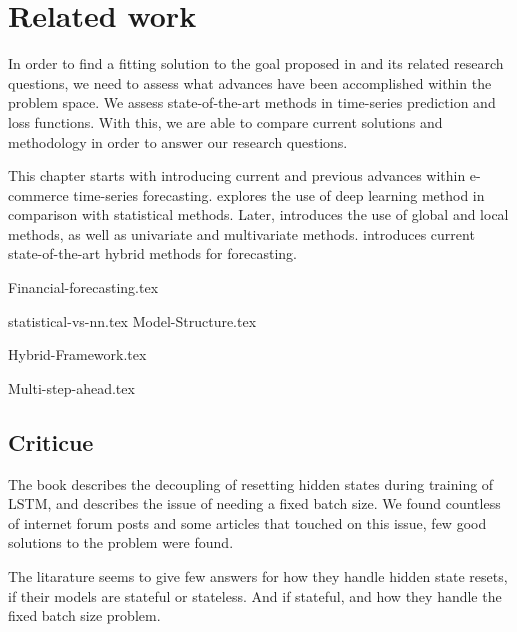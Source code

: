 \chapter{Related work}
\label{section:RelatedWork}

In order to find a fitting solution to the goal proposed in  and its related research questions,
we need to assess what advances have been accomplished within the problem space.
We assess state-of-the-art methods in time-series prediction and loss functions.
With this, we are able to compare current solutions and methodology in order to answer our research questions.

This chapter starts with  introducing current and previous advances within e-commerce time-series forecasting.
 explores the use of deep learning method in comparison with statistical methods.
Later,  introduces the use of global and local methods, as well as univariate and multivariate methods.
 introduces current state-of-the-art hybrid methods for forecasting.



{Financial-forecasting.tex}

{statistical-vs-nn.tex}
{Model-Structure.tex}

{Hybrid-Framework.tex}

{Multi-step-ahead.tex}

\section{Criticue}
The book \cite{Bharadi2021} describes the decoupling of resetting hidden
states during training of LSTM, and describes the issue of
needing a fixed batch size. We found countless of internet forum posts
and some articles that touched on this issue, few good solutions
to the problem were found.

The litarature seems to give few answers for how they handle hidden state
resets, if their models are stateful or stateless. And if stateful,
and how they handle the fixed batch size problem.

